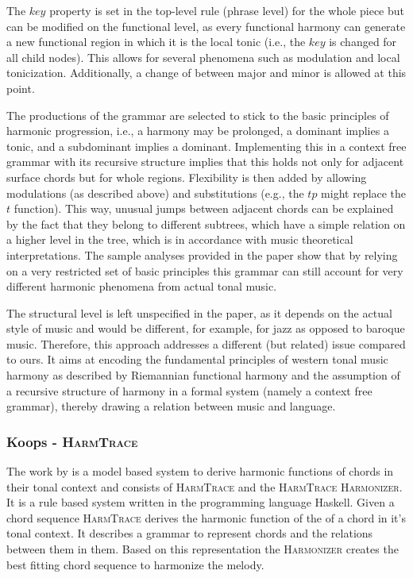 The $key$ property is set in the top-level rule (phrase level) for the whole piece but can be modified on the functional level, as every functional harmony can generate a new functional region in which it is the local tonic (i.e., the $key$ is changed for all child nodes).
This allows for several phenomena such as modulation and local tonicization.
Additionally, a change of between major and minor is allowed at this point.

The productions of the grammar are selected to stick to the basic principles of harmonic progression, i.e., a harmony may be prolonged, a dominant implies a tonic, and a subdominant implies a dominant.
Implementing this in a context free grammar with its recursive structure implies that this holds not only for adjacent surface chords but for whole regions.
Flexibility is then added by allowing modulations (as described above) and substitutions (e.g., the $tp$ might replace the $t$ function).
This way, unusual jumps between adjacent chords can be explained by the fact that they belong to different subtrees, which have a simple relation on a higher level in the tree, which is in accordance with music theoretical interpretations.
The sample analyses provided in the paper show that by relying on a very restricted set of basic principles this grammar can still account for very different harmonic phenomena from actual tonal music.

The structural level is left unspecified in the paper, as it depends on the actual style of music and would be different, for example, for jazz as opposed to baroque music.
Therefore, this approach addresses a different (but related) issue compared to ours.
It aims at encoding the fundamental principles of western tonal music harmony as described by Riemannian functional harmony and the assumption of a recursive structure of harmony in a formal system (namely a context free grammar), thereby drawing a relation between music and language.

\subsubsection{Koops - \textsc{HarmTrace}}
The work by \cite{koops2012} is a model based system to derive harmonic functions of chords in their tonal context and consists of \textsc{HarmTrace} and the \textsc{HarmTrace Harmonizer}. It is a rule based system written in the programming language Haskell. Given a chord sequence \textsc{HarmTrace} derives the harmonic function of the of a chord in it's tonal context. It describes a grammar to represent chords and the relations between them in them. Based on this representation the \textsc{Harmonizer} creates the best fitting chord sequence to harmonize the melody.


